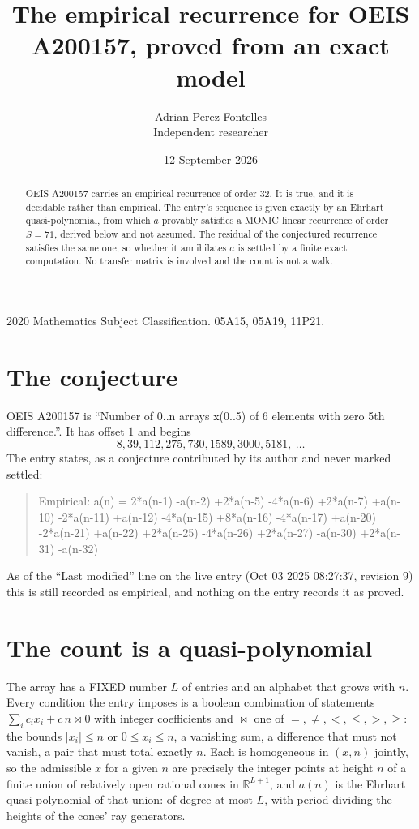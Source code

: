 \documentclass[11pt,a4paper]{article}
\title{The empirical recurrence for OEIS A200157, proved from an exact model}
\author{Adrian Perez Fontelles\\ \small Independent researcher}
\date{12 September 2026}
\theoremstyle{plain}
\theoremstyle{definition}
\begin{document}
\maketitle

\begin{abstract}
OEIS A200157 carries an empirical recurrence of order $32$. It is true, and it is
decidable rather than empirical. The entry's sequence is given exactly by an Ehrhart quasi-polynomial, from
which $a$ provably satisfies a MONIC linear recurrence of order $S=71$, derived below and not
assumed. The residual of the conjectured recurrence satisfies the same one, so whether it
annihilates $a$ is settled by a finite exact computation. No transfer matrix is involved and
the count is not a walk.
\end{abstract}

\noindent\small 2020 Mathematics Subject Classification. 05A15, 05A19, 11P21.\normalsize

\section{The conjecture}

OEIS A200157 is ``Number of 0..n arrays x(0..5) of 6 elements with zero 5th difference.''. It has offset $1$ and begins
\[
8, 39, 112, 275, 730, 1589, 3000, 5181,\ \dots
\]
The entry states, as a conjecture contributed by its author and never marked settled:
\begin{quote}
Empirical: a(n) = 2*a(n-1) -a(n-2) +2*a(n-5) -4*a(n-6) +2*a(n-7) +a(n-10) -2*a(n-11) +a(n-12) -4*a(n-15) +8*a(n-16) -4*a(n-17) +a(n-20) -2*a(n-21) +a(n-22) +2*a(n-25) -4*a(n-26) +2*a(n-27) -a(n-30) +2*a(n-31) -a(n-32)
\end{quote}
As of the ``Last modified'' line on the live entry (Oct 03 2025 08:27:37, revision 9)
this is still recorded as empirical, and nothing on the entry records it as proved.

\section{The count is a quasi-polynomial}

The array has a FIXED number $L$ of entries and an alphabet that grows with $n$. Every
condition the entry imposes is a boolean combination of statements
$\sum_i c_ix_i + c\,n \bowtie 0$ with integer coefficients and $\bowtie$ one of
$=,\ne,<,\le,>,\ge$: the bounds $|x_i|\le n$ or $0\le x_i\le n$, a vanishing sum, a difference
that must not vanish, a pair that must total exactly $n$. Each is homogeneous in $(x,n)$
jointly, so the admissible $x$ for a given $n$ are precisely the integer points at height $n$
of a finite union of relatively open rational cones in $\mathbb{R}^{L+1}$, and $a(n)$ is
the Ehrhart quasi-polynomial of that union: of degree at most $L$, with period dividing the
heights of the cones' ray generators.
\end{document}
